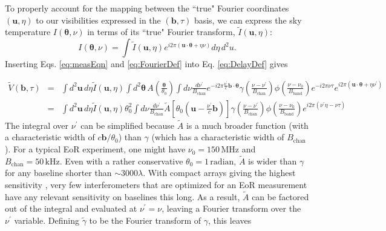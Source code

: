 \documentclass[twocolumn,aps,prd,nofootinbib,showpacs]{revtex4-1}
\begin{document}
To properly account for the mapping between the ``true" Fourier coordinates $(\mathbf{u}, \eta)$ to our visibilities expressed in the $(\mathbf{b}, \tau)$ basis, we can express the sky temperature $I (\boldsymbol \theta , \nu)$ in terms of its ``true" Fourier transform, $\widetilde{I} (\mathbf{u}, \eta)$:
\begin{equation}
\label{eq:FourierDef}
I (\boldsymbol \theta, \nu) = \int \widetilde{I} (\mathbf{u}, \eta) e^{i 2 \pi ( \mathbf{u} \cdot \boldsymbol \theta + \eta \nu)} d\eta \,d^2 u.
\end{equation}
Inserting  Eqs. \eqref{eq:measEqn} and \eqref{eq:FourierDef} into Eq. \eqref{eq:DelayDef} gives
\begin{widetext}
\begin{subequations}
\begin{eqnarray}
\widetilde{V} (\mathbf{b}, \tau) &=&\int d^2\mathbf{u} \, d\eta \widetilde{I} (\mathbf{u}, \eta) \int d^2 \boldsymbol \theta \,A \left( \frac{\boldsymbol \theta}{\theta_0} \right) \int d\nu \frac{d\nu^\prime}{B_\textrm{chan}} e^{-i 2 \pi \frac{\nu^\prime}{c} \mathbf{b} \cdot \boldsymbol \theta} \gamma\left( \frac{\nu-\nu^\prime}{B_\textrm{chan}} \right) \phi \left( \frac{\nu - \nu_0}{B_\textrm{band}} \right) e^{-i 2\pi \nu \tau} e^{i 2 \pi ( \mathbf{u} \cdot \boldsymbol \theta + \eta \nu^\prime)} \\
&=& \int d^2\mathbf{u} \, d\eta \widetilde{I} (\mathbf{u}, \eta) \theta_0^2  \int d\nu \frac{d\nu^\prime}{B_\textrm{chan}} \widetilde{A} \left[ \theta_0 \left( \mathbf{u} - \frac{\nu^\prime}{c} \mathbf{b} \right) \right] \gamma\left( \frac{\nu-\nu^\prime}{B_\textrm{chan}} \right) \phi \left( \frac{\nu - \nu_0}{B_\textrm{band}} \right) e^{i 2\pi(\nu^\prime \eta- \nu \tau)}  
\end{eqnarray}
\end{subequations}
The integral over $\nu^\prime$ can be simplified because $\widetilde{A}$ is a much broader function (with a characteristic width of $c\mathbf{b} / \theta_0$) than $\gamma$ (which has a characteristic width of $B_\textrm{chan}$).  For a typical EoR  experiment, one might have $\nu_0=150\,\textrm{MHz}$ and $B_\textrm{chan} = 50 \,\textrm{kHz}$.  Even with a rather conservative $\theta_0 = 1\,\textrm{radian}$, $\widetilde{A}$ is wider than $\gamma$ for any baseline shorter than $\sim 3000\lambda$.  With compact arrays giving the highest sensitivity \cite{Parsons2012a,Pober2014}, very few interferometers that are optimized for an EoR measurement have any relevant sensitivity on baselines this long.  As a result, $\widetilde{A}$ can be factored out of the integral and evaluated at $\nu^\prime = \nu$, leaving a Fourier transform over the $\nu^\prime$ variable.  Defining $\widetilde{\gamma}$ to be the Fourier transform of $\gamma$, this leaves

\end{widetext}
\end{document}

